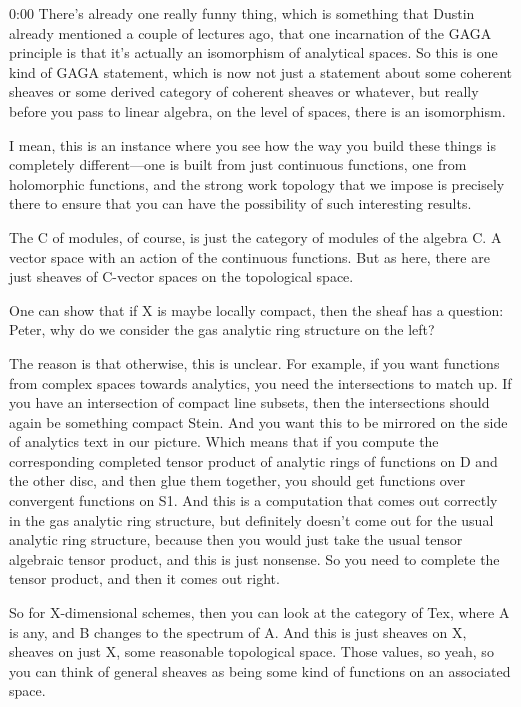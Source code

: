 \begin{unfinished}{0:00}
There's already one really funny thing, which is something that Dustin already mentioned a couple of lectures ago, that one incarnation of the GAGA principle is that it's actually an isomorphism of analytical spaces. So this is one kind of GAGA statement, which is now not just a statement about some coherent sheaves or some derived category of coherent sheaves or whatever, but really before you pass to linear algebra, on the level of spaces, there is an isomorphism.

I mean, this is an instance where you see how the way you build these things is completely different---one is built from just continuous functions, one from holomorphic functions, and the strong work topology that we impose is precisely there to ensure that you can have the possibility of such interesting results.


The C of modules, of course, is just the category of modules of the algebra C. A vector space with an action of the continuous functions. But as here, there are just sheaves of C-vector spaces on the topological space.

One can show that if X is maybe locally compact, then the sheaf has a question: Peter, why do we consider the gas analytic ring structure on the left?

The reason is that otherwise, this is unclear. For example, if you want functions from complex spaces towards analytics, you need the intersections to match up. If you have an intersection of compact line subsets, then the intersections should again be something compact Stein. And you want this to be mirrored on the side of analytics text in our picture. Which means that if you compute the corresponding completed tensor product of analytic rings of functions on D and the other disc, and then glue them together, you should get functions over convergent functions on S1. And this is a computation that comes out correctly in the gas analytic ring structure, but definitely doesn't come out for the usual analytic ring structure, because then you would just take the usual tensor algebraic tensor product, and this is just nonsense. So you need to complete the tensor product, and then it comes out right.

So for X-dimensional schemes, then you can look at the category of Tex, where A is any, and B changes to the spectrum of A. And this is just sheaves on X, sheaves on just X, some reasonable topological space. Those values, so yeah, so you can think of general sheaves as being some kind of functions on an associated space.


\end{unfinished}
